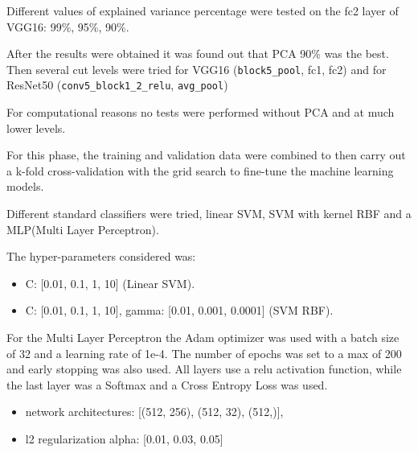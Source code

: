 \noindent
Different values of explained variance percentage were tested on the fc2 layer of VGG16: 99\%, 95\%, 90\%.

\noindent
After the results were obtained it was found out that PCA 90\% was the best. 
Then several cut levels were tried for VGG16 (\texttt{block5\_pool}, fc1, fc2) and for ResNet50 (\texttt{conv5\_block1\_2\_relu}, \texttt{avg\_pool})

\noindent
For computational reasons no tests were performed without PCA and at much lower levels.

\newpage
\noindent
For this phase, the training and validation data were combined to then carry out a k-fold cross-validation with the grid search to fine-tune the machine learning models.

\noindent
Different standard classifiers were tried, linear SVM, SVM with kernel RBF and a MLP(Multi Layer Perceptron).

\noindent
The hyper-parameters considered was:
\begin{itemize}
    \item C: [0.01, 0.1, 1, 10] (Linear SVM).
    \item C: [0.01, 0.1, 1, 10], gamma: [0.01, 0.001, 0.0001] (SVM RBF).
\end{itemize}

\noindent
For the Multi Layer Perceptron the Adam optimizer was used with a batch size of 32 and a learning rate of 1e-4. The number of epochs was set to a max of 200 and early stopping was also used. 
All layers use a relu activation function, while the last layer was a Softmax and a Cross Entropy Loss was used.
\begin{itemize}
    \item network architectures: [(512, 256), (512, 32), (512,)],
    \item l2 regularization alpha: [0.01, 0.03, 0.05]
\end{itemize}
